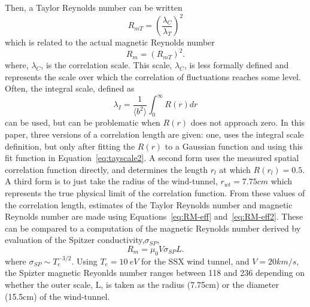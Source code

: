 \documentclass[aip,prl,amsmath,amssymb,reprint,superscriptaddress]{revtex4-1} %
\begin{document}
Then, a Taylor Reynolds number can be written~\cite{frisch95}
%
\begin{equation}
R_{mT}  = \left(\frac{\lambda_{C}}{\lambda_T} \right)^2
\label{eq:RM-eff}
\end{equation}
%
which is related to the actual magnetic Reynolds number
%
\begin{equation}
R_m  = \left( R_{mT} \right) ^2 .
\label{eq:RM-eff2}
\end{equation}
%
where, $\lambda_{C}$, is the correlation scale. This scale, $\lambda_{C}$, is less formally defined and represents the scale over which the correlation of fluctuations reaches some level. Often, the integral scale, defined as
%
\begin{equation}
\lambda_{I}  = \frac{1}{\langle b^2 \rangle} \int_0^\infty R(r) dr
\label{eq:tayscale2}
\end{equation}
%
can be used, but can be problematic when $R(r)$ does not approach zero. In this paper, three versions of a correlation length are given: one, uses the integral scale definition, but only after fitting the $R(r)$ to a Gaussian function and using this fit function in Equation~\ref{eq:tayscale2}. A second form uses the measured spatial correlation function directly, and determines the length $r_{l}$ at which $R(r_{l})=0.5$. A third form is to just take the radius of the wind-tunnel, $r_{wt} = 7.75cm$ which represents the true physical limit of the correlation function. From these values of the correlation length, estimates of the Taylor Reynolds number and magnetic Reynolds number are made using Equations~\ref{eq:RM-eff} and~\ref{eq:RM-eff2}. These can be compared to a computation of the magnetic Reynolds number derived by evaluation of the Spitzer conductivity,$\sigma_{SP}$,
\begin{equation}
R_m = \mu_0 V \sigma_{SP} L.
\label{eq:RM-calc} 
\end{equation}
%
where $\sigma_{SP}\sim T_{e}^{-3/2}$. Using $T_e = 10~eV$ for the SSX wind tunnel, and $V=20km/s$, the Spizter magnetic Reyonlds number ranges between 118 and 236 depending on whether the outer scale, L, is taken as the radius (7.75cm) or the diameter (15.5cm) of the wind-tunnel.
%
%
%
%
\end{document}
